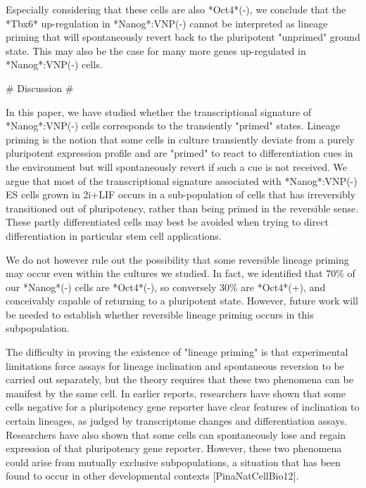 \documentclass[aps,prl,twocolumn,superscriptaddress]{revtex4}
\begin{document}
Especially considering that these cells are also *Oct4*(-), we conclude that the *Tbx6* up-regulation in *Nanog*:VNP(-) cannot be interpreted as lineage priming that will spontaneously revert back to the pluripotent "unprimed" ground state. This may also be the case for many more genes up-regulated in *Nanog*:VNP(-) cells.


# Discussion #

 In this paper, we have studied whether the transcriptional signature of *Nanog*:VNP(-) cells corresponds to the transiently "primed" states. Lineage priming is the notion that some cells in culture transiently deviate from a purely pluripotent expression profile and are "primed" to react to differentiation cues in the environment but will spontaneously revert if such a cue is not received.
We argue that most of the transcriptional signature associated with *Nanog*:VNP(-) ES cells grown in 2i+LIF occurs in a sub-population of cells that has irreversibly transitioned out of pluripotency, rather than being primed in the reversible sense. These partly differentiated cells may best be avoided when trying to direct differentiation in particular stem cell applications.



We do not however rule out the possibility that some reversible lineage priming may occur even within the cultures we studied. In fact, we identified that 70\% of our *Nanog*(-) cells are *Oct4*(-), so conversely 30\% are *Oct4*(+), and conceivably capable of returning to a pluripotent state. However, future work will be needed to establish whether reversible lineage priming occurs in this subpopulation.

The difficulty in proving the existence of "lineage priming" is that experimental limitations force assays for lineage inclination and spontaneous reversion to be carried out separately, but the theory requires that these two phenomena can be manifest by the same cell. In earlier reports, researchers have shown that some cells negative for a pluripotency gene reporter have clear features of inclination to certain lineages, as judged by transcriptome changes and differentiation assays. Researchers have also shown that some cells can spontaneously lose and regain expression of that pluripotency gene reporter. However, these two phenomena could arise from mutually exclusive  subpopulations, a situation that has been found to occur in other developmental contexts [PinaNatCellBio12]. 
\end{document}
